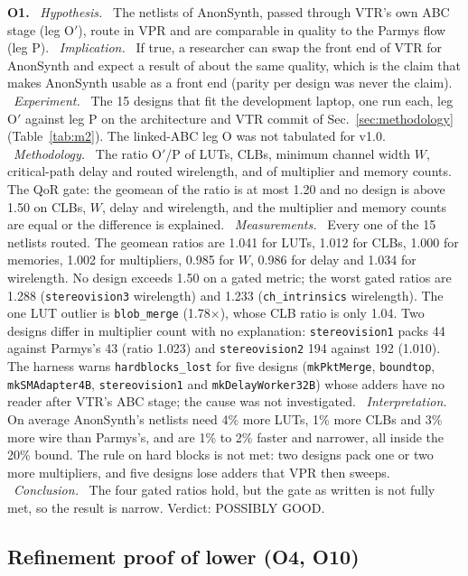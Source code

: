 \documentclass[conference]{IEEEtran}
\newcommand{\code}[1]{\texttt{#1}}
\newcommand{\argid}[1]{\par\smallskip\noindent\textbf{#1.}}
\newcommand{\ah}[1]{\ \textit{#1.}\ }
\begin{document}
\argid{O1}
\ah{Hypothesis} The netlists of AnonSynth, passed through VTR's own ABC stage (leg O$'$), route in VPR and are comparable in quality to the Parmys flow (leg P).
\ah{Implication} If true, a researcher can swap the front end of VTR for AnonSynth and expect a result of about the same quality, which is the claim that makes AnonSynth usable as a front end (parity per design was never the claim).
\ah{Experiment} The 15 designs that fit the development laptop, one run each, leg O$'$ against leg P on the architecture and VTR commit of Sec.~\ref{sec:methodology} (Table~\ref{tab:m2}). The linked-ABC leg O was not tabulated for v1.0.
\ah{Methodology} The ratio O$'$/P of LUTs, CLBs, minimum channel width $W$, critical-path delay and routed wirelength, and of multiplier and memory counts. The QoR gate: the geomean of the ratio is at most 1.20 and no design is above 1.50 on CLBs, $W$, delay and wirelength, and the multiplier and memory counts are equal or the difference is explained.
\ah{Measurements} Every one of the 15 netlists routed. The geomean ratios are 1.041 for LUTs, 1.012 for CLBs, 1.000 for memories, 1.002 for multipliers, 0.985 for $W$, 0.986 for delay and 1.034 for wirelength. No design exceeds 1.50 on a gated metric; the worst gated ratios are 1.288 (\code{stereovision3} wirelength) and 1.233 (\code{ch\_intrinsics} wirelength). The one LUT outlier is \code{blob\_merge} (1.78$\times$), whose CLB ratio is only 1.04. Two designs differ in multiplier count with no explanation: \code{stereovision1} packs 44 against Parmys's 43 (ratio 1.023) and \code{stereovision2} 194 against 192 (1.010). The harness warns \code{hardblocks\_lost} for five designs (\code{mkPktMerge}, \code{boundtop}, \code{mkSMAdapter4B}, \code{stereovision1} and \code{mkDelayWorker32B}) whose adders have no reader after VTR's ABC stage; the cause was not investigated.
\ah{Interpretation} On average AnonSynth's netlists need 4\% more LUTs, 1\% more CLBs and 3\% more wire than Parmys's, and are 1\% to 2\% faster and narrower, all inside the 20\% bound. The rule on hard blocks is not met: two designs pack one or two more multipliers, and five designs lose adders that VPR then sweeps.
\ah{Conclusion} The four gated ratios hold, but the gate as written is not fully met, so the result is narrow. Verdict: POSSIBLY GOOD.

\subsection{Refinement proof of lower (O4, O10)}
\label{sec:q-proof}
\label{sec:verify-evidence}
\end{document}
